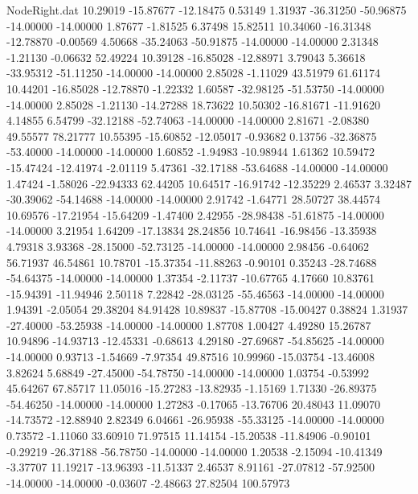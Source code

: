 \begin{filecontents}{NodeRight.dat}
  10.29019  -15.87677  -12.18475     0.53149    1.31937  -36.31250  -50.96875  -14.00000  -14.00000    1.87677   -1.81525    6.37498   15.82511
  10.34060  -16.31348  -12.78870    -0.00569    4.50668  -35.24063  -50.91875  -14.00000  -14.00000    2.31348   -1.21130   -0.06632   52.49224
  10.39128  -16.85028  -12.88971     3.79043    5.36618  -33.95312  -51.11250  -14.00000  -14.00000    2.85028   -1.11029   43.51979   61.61174
  10.44201  -16.85028  -12.78870    -1.22332    1.60587  -32.98125  -51.53750  -14.00000  -14.00000    2.85028   -1.21130  -14.27288   18.73622
  10.50302  -16.81671  -11.91620     4.14855    6.54799  -32.12188  -52.74063  -14.00000  -14.00000    2.81671   -2.08380   49.55577   78.21777
  10.55395  -15.60852  -12.05017    -0.93682    0.13756  -32.36875  -53.40000  -14.00000  -14.00000    1.60852   -1.94983  -10.98944    1.61362
  10.59472  -15.47424  -12.41974    -2.01119    5.47361  -32.17188  -53.64688  -14.00000  -14.00000    1.47424   -1.58026  -22.94333   62.44205
  10.64517  -16.91742  -12.35229     2.46537    3.32487  -30.39062  -54.14688  -14.00000  -14.00000    2.91742   -1.64771   28.50727   38.44574
  10.69576  -17.21954  -15.64209    -1.47400    2.42955  -28.98438  -51.61875  -14.00000  -14.00000    3.21954    1.64209  -17.13834   28.24856
  10.74641  -16.98456  -13.35938     4.79318    3.93368  -28.15000  -52.73125  -14.00000  -14.00000    2.98456   -0.64062   56.71937   46.54861
  10.78701  -15.37354  -11.88263    -0.90101    0.35243  -28.74688  -54.64375  -14.00000  -14.00000    1.37354   -2.11737  -10.67765    4.17660
  10.83761  -15.94391  -11.94946     2.50118    7.22842  -28.03125  -55.46563  -14.00000  -14.00000    1.94391   -2.05054   29.38204   84.91428
  10.89837  -15.87708  -15.00427     0.38824    1.31937  -27.40000  -53.25938  -14.00000  -14.00000    1.87708    1.00427    4.49280   15.26787
  10.94896  -14.93713  -12.45331    -0.68613    4.29180  -27.69687  -54.85625  -14.00000  -14.00000    0.93713   -1.54669   -7.97354   49.87516
  10.99960  -15.03754  -13.46008     3.82624    5.68849  -27.45000  -54.78750  -14.00000  -14.00000    1.03754   -0.53992   45.64267   67.85717
  11.05016  -15.27283  -13.82935    -1.15169    1.71330  -26.89375  -54.46250  -14.00000  -14.00000    1.27283   -0.17065  -13.76706   20.48043
  11.09070  -14.73572  -12.88940     2.82349    6.04661  -26.95938  -55.33125  -14.00000  -14.00000    0.73572   -1.11060   33.60910   71.97515
  11.14154  -15.20538  -11.84906    -0.90101   -0.29219  -26.37188  -56.78750  -14.00000  -14.00000    1.20538   -2.15094  -10.41349   -3.37707
  11.19217  -13.96393  -11.51337     2.46537    8.91161  -27.07812  -57.92500  -14.00000  -14.00000   -0.03607   -2.48663   27.82504  100.57973

\end{filecontents}
